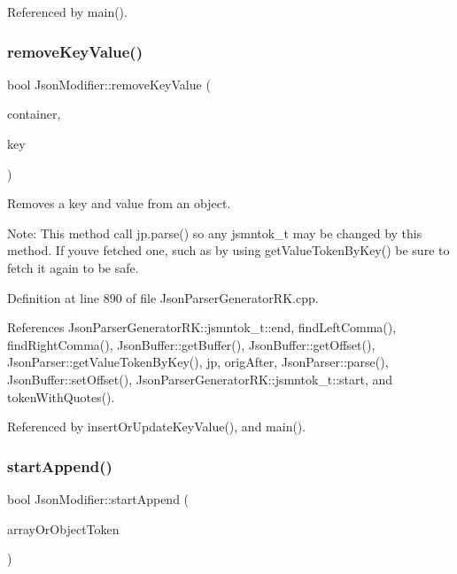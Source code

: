 Referenced by main().

\mbox{\label{class_json_modifier_aadf76d2cef6b1a6ffe7868031cfb0e11}} 
\subsubsection{\texorpdfstring{remove\+Key\+Value()}{removeKeyValue()}}
{\footnotesize\ttfamily bool Json\+Modifier\+::remove\+Key\+Value (\begin{DoxyParamCaption}\item[{const \hyperlink{struct_json_parser_generator_r_k_1_1jsmntok__t}{Json\+Parser\+Generator\+R\+K\+::jsmntok\+\_\+t} $\ast$}]{container,  }\item[{const char $\ast$}]{key }\end{DoxyParamCaption})}



Removes a key and value from an object. 

Note\+: This method call jp.\+parse() so any jsmntok\+\_\+t may be changed by this method. If you\textquotesingle{}ve fetched one, such as by using get\+Value\+Token\+By\+Key() be sure to fetch it again to be safe. 

Definition at line 890 of file Json\+Parser\+Generator\+R\+K.\+cpp.



References Json\+Parser\+Generator\+R\+K\+::jsmntok\+\_\+t\+::end, find\+Left\+Comma(), find\+Right\+Comma(), Json\+Buffer\+::get\+Buffer(), Json\+Buffer\+::get\+Offset(), Json\+Parser\+::get\+Value\+Token\+By\+Key(), jp, orig\+After, Json\+Parser\+::parse(), Json\+Buffer\+::set\+Offset(), Json\+Parser\+Generator\+R\+K\+::jsmntok\+\_\+t\+::start, and token\+With\+Quotes().



Referenced by insert\+Or\+Update\+Key\+Value(), and main().

\mbox{\label{class_json_modifier_ab5bf356377a71120588413a4be998607}} 
\subsubsection{\texorpdfstring{start\+Append()}{startAppend()}}
{\footnotesize\ttfamily bool Json\+Modifier\+::start\+Append (\begin{DoxyParamCaption}\item[{const \hyperlink{struct_json_parser_generator_r_k_1_1jsmntok__t}{Json\+Parser\+Generator\+R\+K\+::jsmntok\+\_\+t} $\ast$}]{array\+Or\+Object\+Token }\end{DoxyParamCaption})}



